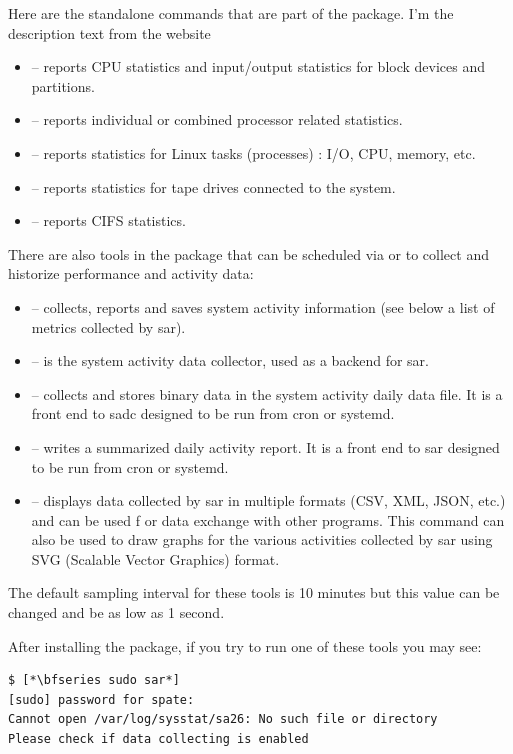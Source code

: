 \noindent
Here are the standalone commands that are part of the package. I'm the description text from the website

\begin{itemize}
	\item {} -- reports CPU statistics and input/output statistics for block devices and partitions.
	\item {} -- reports individual or combined processor related statistics.
	\item {} -- reports statistics for Linux tasks (processes) : I/O, CPU, memory, etc.
	\item {} -- reports statistics for tape drives connected to the system.
	\item {} -- reports CIFS statistics.
\end{itemize}

\noindent
There are also tools in the package that can be scheduled via  or  to collect and historize performance and activity data:

\begin{itemize}
	\item {} -- collects, reports and saves system activity information (see below a list of metrics collected by sar).
	\item {} -- is the system activity data collector, used as a backend for sar.
	\item {} -- collects and stores binary data in the system activity daily data file. It is a front end to sadc 
		designed to be run from cron or systemd.
	\item {} -- writes a summarized daily activity report. It is a front end to sar designed to be run from cron or systemd.
	\item {} -- displays data collected by sar in multiple formats (CSV, XML, JSON, etc.) and can be used f
		or data exchange with other programs. This command can also be used to draw graphs for the various 
		activities collected by sar using SVG (Scalable Vector Graphics) format.
\end{itemize}

\noindent
The default sampling interval for these tools is 10 minutes but this value can be changed and be as low as 1 second.

After installing the package, if you try to run one of these tools you may see:

\begin{lstlisting}
$ [*\bfseries sudo sar*]
[sudo] password for spate: 
Cannot open /var/log/sysstat/sa26: No such file or directory
Please check if data collecting is enabled
\end{lstlisting}

